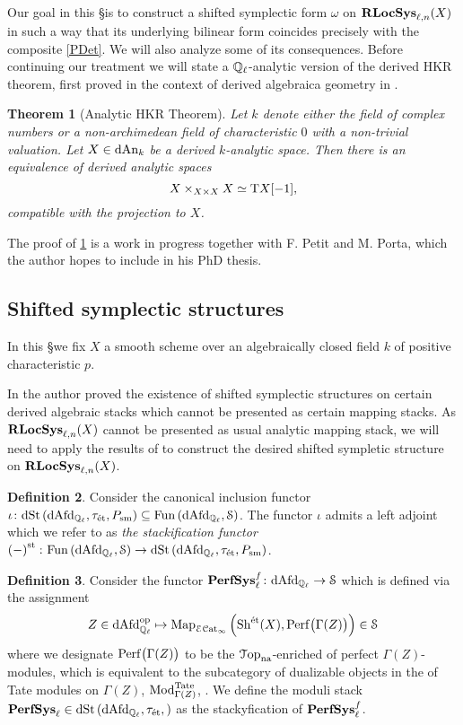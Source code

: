 \documentclass[10pt,a4paper]{amsart}
\numberwithin{equation}{subsection}
\theoremstyle{plain}
\newtheorem{theorem}{Theorem}[section]
\theoremstyle{definition}
\newtheorem{defi}[theorem]{Definition}
\theoremstyle{remark}
\numberwithin{equation}{section}
\begin{document}
Our goal in this \S is to construct a shifted symplectic form $\omega$ on $\mathbf R \mathbf{LocSys}_{\ell, n}(X)$ in such a way that its underlying bilinear form coincides precisely with the composite \cref{PDet}. We will also analyze some of its consequences. Before continuing our
treatment we will state a $\mathbb Q_\ell$-analytic version of the derived HKR theorem, first proved in the context of derived algebraica geometry in \cite{toen_s1}.

\begin{theorem}[Analytic HKR Theorem] \label{analytic_HKR}
Let $k$ denote either the field of complex numbers or a non-archimedean field of characteristic $0$ with a non-trivial valuation. Let $X  \in \mathrm{dAn}_k$ be a derived $k$-analytic space. Then there is an equivalence of derived analytic spaces
	\[
		X \times_{X \times X } X \simeq \mathrm T X[-1],
	\]
compatible with the projection to $X$.
\end{theorem}

The proof of \cref{analytic_HKR} is a work in progress together with F. Petit and M. Porta, which the author hopes to include in his PhD thesis.

\subsection{Shifted symplectic structures} In this \S we fix $X$ a smooth scheme over an algebraically closed field $k$ of positive characteristic $p $.

In \cite{toen_ss} the author proved the existence of shifted symplectic structures on certain derived algebraic stacks which cannot be presented as certain mapping stacks. As $\mathbf R \mathbf{LocSys}_{\ell, n}(X)$ cannot be presented as usual analytic mapping stack,
we will need to apply the results of \cite{toen_ss} to construct the desired shifted sympletic structure on $\mathbf R \mathbf{LocSys}_{\ell, n}(X)$. 


\begin{defi}
Consider the canonical inclusion functor $\iota \colon \mathrm{dSt} \left( \mathrm{dAfd}_{\mathbb{Q}_\ell}, \tau_{\text{\'et}}, P_{\mathrm{sm}} \right) \subseteq \mathrm{Fun} \left( \mathrm{dAfd}_{\mathbb{Q}_\ell}, \mathcal S \right)$. The functor $\iota$ admits a left adjoint which we refer to as \emph{the stackification functor} $\left(- \right)^{\mathrm{st}} \colon
\mathrm{Fun} \left( \mathrm{dAfd}_{\mathbb{Q}_\ell}, \mathcal S \right) 
\to \mathrm{dSt} \left( \mathrm{dAfd}_{\mathbb{Q}_\ell}, \tau_{\text{\'et}}, P_{\mathrm{sm}} \right)$.
\end{defi}

\begin{defi}
Consider the functor $ \mathbf{PerfSys}_{\ell}^f \colon \mathrm{dAfd}_{\mathbb{Q}_\ell} \to \mathcal S$ which is defined via the assignment
	\[
		Z \in \mathrm{dAfd}_{\mathbb{Q}_\ell}^{\mathrm{op}} \mapsto \mathrm{Map}_{\mathcal E \mathcal{C}\mathrm{at}_\infty}  \left( \mathrm{Sh}^{\text{\'et}}(X), \mathrm{Perf} \big( \Gamma(Z) \big) \right) \in \mathcal S
	\]
where we designate $\mathrm{Perf} \big(\Gamma(Z) \big)
$ to be the  $\mathcal{T} \mathrm{op}_{\mathrm{na}}$-enriched \infcat of perfect $\Gamma(Z)$-modules, which is equivalent to the subcategory of dualizable objects in the \infcat of Tate modules on $\Gamma(Z)$, $\mathrm{Mod}^{\mathrm{Tate}}_{\Gamma(Z)}$, \cite{need reference 
here}. We define the moduli stack $\mathbf{PerfSys}_{\ell} \in \mathrm{dSt} \left( \mathrm{dAfd}_{\mathbb{Q}_\ell}, \tau_{\text{\'et}}, \right)$ as the stackyfication of $\mathbf{PerfSys}_{\ell}^f$.
\end{defi}
\end{document}
